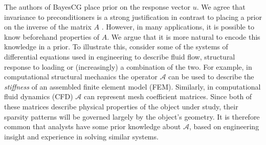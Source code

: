 \documentclass[twoside]{article}
\begin{document}
		The authors of BayesCG place prior on the response vector $u$. We agree that invariance to preconditioners is a strong justification in contrast to placing a prior on the inverse of the matrix $A$  \cite{Hen15}. However, in many applications, it is possible to know beforehand properties of $A$. We argue that it is more natural to encode this knowledge in a prior. %
		To illustrate this, consider some of the systems of differential equations %
		used in engineering to describe fluid flow, structural response to loading or (increasingly) a combination of the two. %
		For example, in computational structural mechanics the operator $\mathcal{A}$ can be used to describe the \textit{stiffness} of an assembled finite element model (FEM). Similarly, in computational fluid dynamics (CFD) $\mathcal{A}$ can represent mesh coefficient matrices. Since both of these matrices describe physical properties of the object under study, their sparsity patterns will be governed largely by the object's geometry. It is therefore common that analysts have some prior knowledge about $\mathcal{A}$, based on engineering insight and experience in solving similar systems.
		
\end{document}
